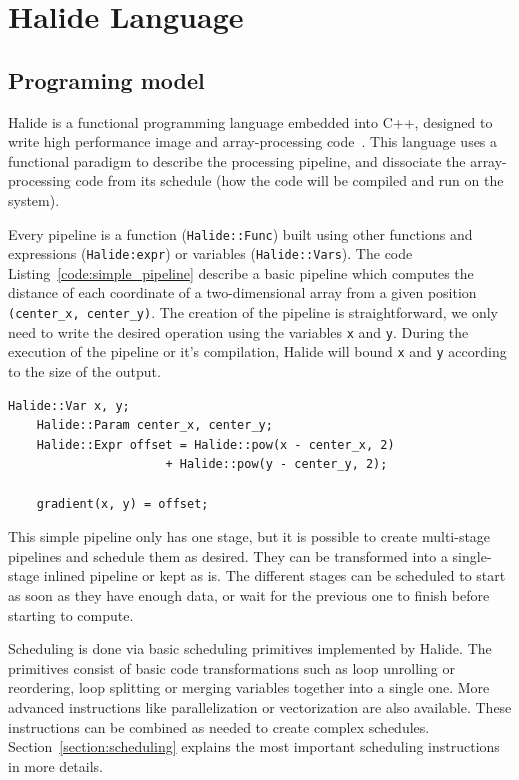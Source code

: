\section{Halide Language}
	\subsection { Programing model}
		Halide is a functional programming language embedded into C++, designed to write high performance image and array-processing code~\cite{Web:Halide}. This language uses a functional paradigm to describe the processing pipeline, and dissociate the array-processing code from its schedule (how the code will be compiled and run on the system). 


		Every pipeline is a function (\texttt{Halide::Func}) built using other functions and expressions (\verb|Halide:expr|) or variables (\texttt{Halide::Vars}).
		The code Listing~\ref{code:simple_pipeline} describe a basic pipeline which computes the distance of each coordinate of a two-dimensional array from a given position \texttt{(center\_x, center\_y)}. 
		The creation of the pipeline is straightforward, we only need to write the desired operation using the variables \verb|x| and \verb|y|. During the execution of the pipeline or it's compilation, Halide will bound \verb|x| and \verb|y| according to the size of the output.
\lstset{basicstyle=\ttfamily\footnotesize,breaklines=true,tabsize=2}
\begin{lstlisting}[caption={Simple Pipeline Example.}, captionpos=b, label={code:simple_pipeline}]
	Halide::Var x, y;
	Halide::Param center_x, center_y;
	Halide::Expr offset = Halide::pow(x - center_x, 2) 
                      + Halide::pow(y - center_y, 2);

	gradient(x, y) = offset;
\end{lstlisting}

	This simple pipeline only has one stage, but it is possible to create multi-stage pipelines and schedule them as desired. They can be transformed into a single-stage inlined pipeline or kept as is.
	The different stages can be scheduled to start as soon as they have enough data, or wait for the previous one to finish before starting to compute.

	Scheduling is done via basic scheduling primitives implemented by Halide.
The primitives consist of basic code transformations such as loop unrolling or reordering, loop splitting or merging variables together into a single one. More advanced instructions like parallelization or vectorization are also available. These instructions can be combined as needed to create complex schedules.
Section~\ref{section:scheduling} explains the most important scheduling instructions in more details. 


